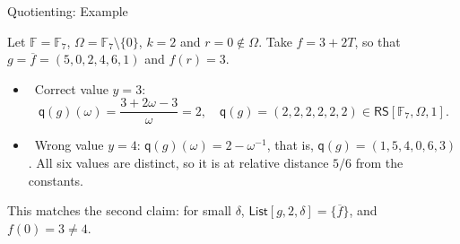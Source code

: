 \documentclass{zkdl-presentation-template}
\begin{document}
    \begin{frame}{Quotienting: Example}
        \begin{example}
            Let $\mathbb{F} = \mathbb{F}_7$, $\Omega = \mathbb{F}_7 \setminus \{0\}$, $k = 2$ and $r = 0 \notin \Omega$. Take $f = 3 + 2T$, so that $g = \overline{f} = (5, 0, 2, 4, 6, 1)$ and $f(r) = 3$.
        \end{example}
        \pause

        \begin{itemize}
            \item \cmark\ Correct value $y = 3$:
            \begin{equation*}
                \mathsf{q}(g)(\omega) = \frac{3 + 2\omega - 3}{\omega} = 2, \quad \mathsf{q}(g) = (2, 2, 2, 2, 2, 2) \in \mathsf{RS}[\mathbb{F}_7, \Omega, 1].
            \end{equation*}
            \pause
            \item \xmark\ Wrong value $y = 4$: $\mathsf{q}(g)(\omega) = 2 - \omega^{-1}$, that is, $\mathsf{q}(g) = (1, 5, 4, 0, 6, 3)$. All six values are distinct, so it is at relative distance $5/6$ from the constants.
        \end{itemize}
        \pause

        This matches the second claim: for small $\delta$, $\mathsf{List}[g, 2, \delta] = \{\overline{f}\}$, and $f(0) = 3 \neq 4$.
    \end{frame}
\end{document}
